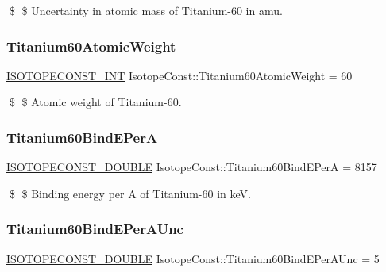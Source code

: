\$ \$ Uncertainty in atomic mass of Titanium-\/60 in amu. \mbox{\label{group___isotope_const-_titanium-_ti60_ga21fc3ea99c664aaa67be37570ec3552f}} 
\subsubsection{\texorpdfstring{Titanium60\+Atomic\+Weight}{Titanium60AtomicWeight}}
{\footnotesize\ttfamily \mbox{\hyperlink{group___isotope_const-_macros_ga5f18360b3e99483a35c32d789e62621c}{I\+S\+O\+T\+O\+P\+E\+C\+O\+N\+S\+T\+\_\+\+I\+NT}} Isotope\+Const\+::\+Titanium60\+Atomic\+Weight = 60}

\$ \$ Atomic weight of Titanium-\/60. \mbox{\label{group___isotope_const-_titanium-_ti60_ga00d70b679346c25f81dc61396984ed97}} 
\subsubsection{\texorpdfstring{Titanium60\+Bind\+E\+PerA}{Titanium60BindEPerA}}
{\footnotesize\ttfamily \mbox{\hyperlink{group___isotope_const-_macros_ga8f45a7272ce02c0b4c65c44636ed719a}{I\+S\+O\+T\+O\+P\+E\+C\+O\+N\+S\+T\+\_\+\+D\+O\+U\+B\+LE}} Isotope\+Const\+::\+Titanium60\+Bind\+E\+PerA = 8157}

\$ \$ Binding energy per A of Titanium-\/60 in keV. \mbox{\label{group___isotope_const-_titanium-_ti60_gaffe2a45e706a46abc7817f87243305fb}} 
\subsubsection{\texorpdfstring{Titanium60\+Bind\+E\+Per\+A\+Unc}{Titanium60BindEPerAUnc}}
{\footnotesize\ttfamily \mbox{\hyperlink{group___isotope_const-_macros_ga8f45a7272ce02c0b4c65c44636ed719a}{I\+S\+O\+T\+O\+P\+E\+C\+O\+N\+S\+T\+\_\+\+D\+O\+U\+B\+LE}} Isotope\+Const\+::\+Titanium60\+Bind\+E\+Per\+A\+Unc = 5}

